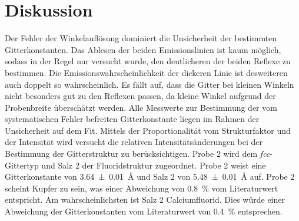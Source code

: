 \section{Diskussion}\label{sec:Diskussion}
Der Fehler der Winkelauflösung  dominiert die Unsicherheit der bestimmten
Gitterkonstanten. 
Das Ablesen der beiden Emissionslinien ist kaum möglich,
sodass in der Regel nur versucht wurde, den deutlicheren der beiden Reflexe zu bestimmen.
Die Emissionswahrscheinlichkeit der dickeren Linie ist desweiteren auch
doppelt so wahrscheinlich. 
Es fällt auf, dass die Gitter bei kleinen Winkeln nicht besonders gut zu den
Reflexen passen, da kleine Winkel aufgrund der Probenbreite überschätzt werden.
Alle Messwerte zur Bestimmung der vom systematischen Fehler befreiten
Gitterkonstante liegen im Rahmen der Unsicherheit auf dem Fit.
Mittels der Proportionalität vom Strukturfaktor und der Intensität wird
versucht die relativen Intensitätsänderungen bei der Bestimmung der
Gitterstruktur zu berücksichtigen.
Probe 2 wird dem \textit{fcc}-Gittertyp und Salz 2 der Fluoridstruktur zugeordnet. 
Probe 2 weist eine Gitterkonstante von \SI{3.64 +- 0.01}{\angstrom}
und Salz 2 von \SI{5.48 +- 0.01}{\angstrom} auf.
Probe 2 scheint Kupfer zu sein, was einer Abweichung von \SI{0.8}{\percent} vom Literaturwert
\cite{kupfer} entspricht.
Am wahrscheinlichsten ist Salz 2 Calciumfluorid. Dies würde einer Abweichung
der Gitterkonstanten vom Literaturwert \cite{CaF2} von \SI{0.4}{\percent} entsprechen.
